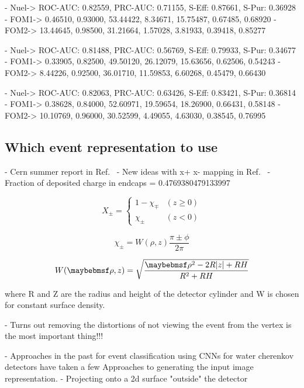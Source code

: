 - Nuel-> ROC-AUC: 0.82559, PRC-AUC: 0.71155, S-Eff: 0.87661, S-Pur: 0.36928
- FOM1-> 0.46510, 0.93000, 53.44422, 8.34671, 15.75487, 0.67485, 0.68920
- FOM2-> 13.44645, 0.98500, 31.21664, 1.57028, 3.81933, 0.39418, 0.85277

- Nuel-> ROC-AUC: 0.81488, PRC-AUC: 0.56769, S-Eff: 0.79933, S-Pur: 0.34677
- FOM1-> 0.33905, 0.82500, 49.50120, 26.12079, 15.63656, 0.62506, 0.54243
- FOM2-> 8.44226, 0.92500, 36.01710, 11.59853, 6.60268, 0.45479, 0.66430

- Nuel-> ROC-AUC: 0.82063, PRC-AUC: 0.63426, S-Eff: 0.83421, S-Pur: 0.36814
- FOM1-> 0.38628, 0.84000, 52.60971, 19.59654, 18.26900, 0.66431, 0.58148
- FOM2-> 10.10769, 0.96000, 30.52599, 4.49055, 4.63030, 0.38545, 0.76995

\subsection{Which event representation to use} %
\label{sec:cvn_baseline_repr} %

- Cern summer report in Ref.~\cite{theodore2016}
- New ideas with x+ x- mapping in Ref.~\cite{berns2020}
- Fraction of deposited charge in endcaps = 0.4769380479133997


\begin{equation} %
    X_{\pm}=
    \begin{cases}
        1-\chi_{\mp} & (z \geq 0) \\
        \chi_{\pm}   & (z < 0)
    \end{cases}
\end{equation}

\begin{equation} %
    \chi_{\pm}=W(\rho,z)\frac{\pi\pm\phi}{2\pi}
\end{equation}

\begin{equation}
    W(\rho,z)=\sqrt{\frac{\rho^{2}-2R\abs{z}+RH}{R^{2}+RH}}
\end{equation}

where R and Z are the radius and height of the detector cylinder and W is chosen for constant
surface density.

- Turns out removing the distortions of not viewing the event from the vertex is the most important
thing!!!


- Approaches in the past for event classification using CNNs for water cherenkov detectors have
taken a few Approaches to generating the input image representation.
- Projecting onto a 2d surface "outside" the detector

